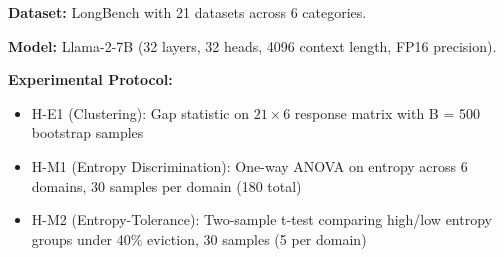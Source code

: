 
\textbf{Dataset:} LongBench with 21 datasets across 6 categories.

\textbf{Model:} Llama-2-7B (32 layers, 32 heads, 4096 context length, FP16 precision).

\textbf{Experimental Protocol:}
\begin{itemize}
\item H-E1 (Clustering): Gap statistic on $21\times 6$ response matrix with B = 500 bootstrap samples
\item H-M1 (Entropy Discrimination): One-way ANOVA on entropy across 6 domains, 30 samples per domain (180 total)
\item H-M2 (Entropy-Tolerance): Two-sample t-test comparing high/low entropy groups under 40\% eviction, 30 samples (5 per domain)
\end{itemize}
